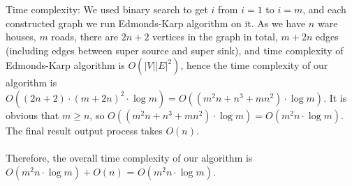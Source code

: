 \documentclass[12pt]{article}
\begin{document}
Time complexity: We used binary search to get $i$ from $i = 1$ to $i = m$, and each constructed graph we 
run Edmonds-Karp algorithm on it. As we have $n$ ware houses, $m$ roads,
there are $2n+2$ vertices in the graph in total, $m+2n$ edges (including 
edges between super source  and super sink), and time complexity of Edmonds-Karp algorithm
is $O(|V||E|^2)$,
hence the time complexity of our algorithm is $O((2n+2) \cdot (m+2n)^2 \cdot \log{m}) = O((m^2n + n^3 + mn^2) \cdot \log{m})$. 
It is obvious that $m \ge n$, so $O((m^2n + n^3 + mn^2) \cdot \log{m}) = O(m^2n \cdot \log{m})$.
The final result output process takes $O(n)$.\\\\
Therefore, the overall time complexity of our algorithm is $O(m^2n \cdot \log{m})+O(n)$ = 
$O(m^2n\cdot \log{m})$.
\end{document}
